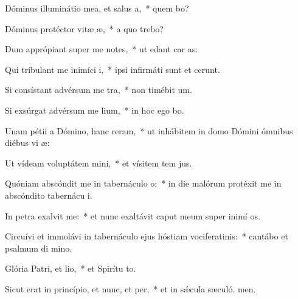 \item Dóminus illuminátio mea, et salus a,~* quem bo?
\item Dóminus protéctor vitæ æ,~* a quo trebo?
\item Dum apprópiant super me notes,~* ut edant car as:
\item Qui tríbulant me inimíci i,~* ipsi infirmáti sunt et cerunt.
\item Si consístant advérsum me tra,~* non timébit  um.
\item Si exsúrgat advérsum me lium,~* in hoc ego bo.
\item Unam pétii a Dómino, hanc reram,~* ut inhábitem in domo Dómini ómnibus diébus vi æ:
\item Ut vídeam voluptátem mini,~* et vísitem tem jus.
\item Quóniam abscóndit me in tabernáculo o:~* in die malórum protéxit me in abscóndito tabernácu i.
\item In petra exalvit me:~* et nunc exaltávit caput meum super inimí os.
\item Circuívi et immolávi in tabernáculo ejus hóstiam vociferatinis:~* cantábo et psalmum di mino.
\item Glória Patri, et lio,~* et Spirítu to.
\item Sicut erat in princípio, et nunc, et per,~* et in sǽcula sæculó. men.
